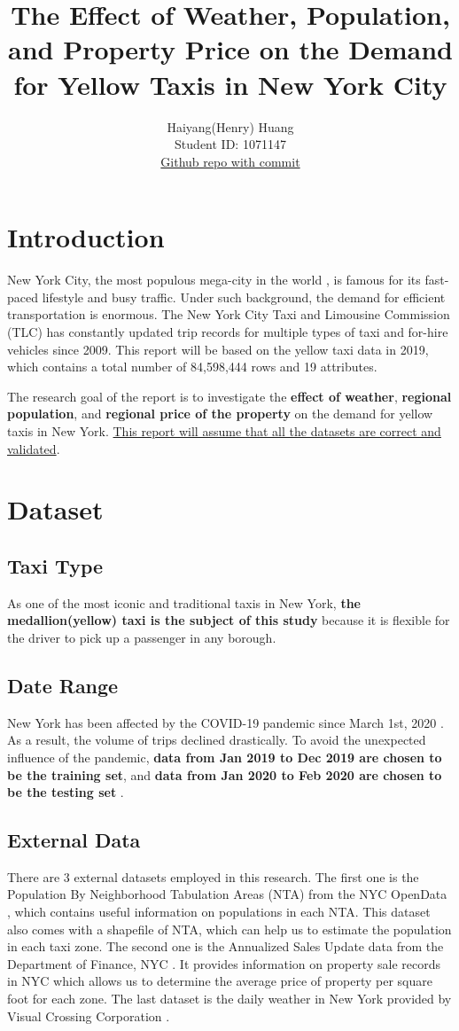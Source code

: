 \documentclass[11pt]{article}
\title{\textbf{The Effect of Weather, Population, and Property Price on the Demand for Yellow Taxis in New York City}}
\author{
Haiyang(Henry) Huang \\
Student ID: 1071147 \\
\href{https://github.com/MAST30034-Applied-Data-Science/mast30034-project-1-HenryHuang2}{Github repo with commit}
}
\begin{document}
\maketitle

\section{Introduction}
New York City, the most populous mega-city in the world \cite{nycintro}, is famous for its fast-paced lifestyle and busy traffic. Under such background, the demand for efficient transportation is enormous. The New York City Taxi and Limousine Commission (TLC) has constantly updated trip records for multiple types of taxi and for-hire vehicles since 2009. This report will be based on the yellow taxi data in 2019\cite{tlcdata}, which contains a total number of 84,598,444 rows and 19 attributes.


The research goal of the report is to investigate the \textbf{effect of weather}, \textbf{regional population}, and \textbf{regional price of the property} on the demand for yellow taxis in New York. \ul{This report will assume that all the datasets are correct and validated}.

\section{Dataset}
\subsection{Taxi Type}
As one of the most iconic and traditional taxis in New York, \textbf{the medallion(yellow) taxi is the subject of this study} because it is flexible for the driver to pick up a passenger in any borough.
\subsection{Date Range}
New York has been affected by the COVID-19 pandemic since March 1st, 2020 \cite{covidintro}. As a result, the volume of trips declined drastically. To avoid the unexpected influence of the pandemic, \textbf{data from Jan 2019 to Dec 2019 are chosen to be the training set}, and \textbf{data from Jan 2020 to Feb 2020 are chosen to be the testing set} \cite{tlcdata}. 
\subsection{External Data}
There are 3 external datasets employed in this research. The first one is the Population By Neighborhood Tabulation Areas (NTA) from the NYC OpenData \cite{populationdata}, which contains useful information on populations in each NTA. This dataset also comes with a shapefile of NTA, which can help us to estimate the population in each taxi zone. The second one is the Annualized Sales Update data from the Department of Finance, NYC \cite{propertydata}. It provides information on property sale records in NYC which allows us to determine the average price of property per square foot for each zone. The last dataset is the daily weather in New York provided by Visual Crossing Corporation \cite{weatherdata}.
\end{document}
